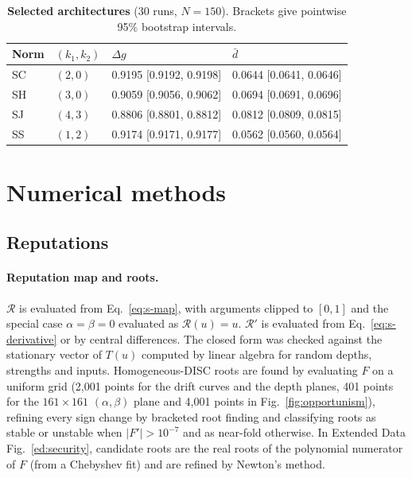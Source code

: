 \documentclass[10pt]{wlscirep}
\newcommand{\Rmap}{\mathscr{R}}            %
\theoremstyle{plain}
\theoremstyle{remark}
\begin{document}
\begin{table}[!htbp]
\centering
\caption{\textbf{Selected architectures} (30 runs, $N=150$). Brackets give pointwise 95\% bootstrap intervals.}
\label{tab:si-selected}
\small
\begin{tabular}{@{}llll@{}}
\toprule
Norm & $(k_1,k_2)$ & $\Delta g$ & $\bar d$\\
\midrule
SC & $(2,0)$ & 0.9195 [0.9192, 0.9198] & 0.0644 [0.0641, 0.0646]\\
SH & $(3,0)$ & 0.9059 [0.9056, 0.9062] & 0.0694 [0.0691, 0.0696]\\
SJ & $(4,3)$ & 0.8806 [0.8801, 0.8812] & 0.0812 [0.0809, 0.0815]\\
SS & $(1,2)$ & 0.9174 [0.9171, 0.9177] & 0.0562 [0.0560, 0.0564]\\
\bottomrule
\end{tabular}
\end{table}

\FloatBarrier
\section{Numerical methods}
\label{si:numerics}

\subsection{Reputations}

\paragraph{Reputation map and roots.} $\Rmap$ is evaluated from Eq.~\eqref{eq:s-map}, with arguments clipped to $[0,1]$ and the special case $\alpha=\beta=0$ evaluated as $\Rmap(u)=u$. $\Rmap'$ is evaluated from Eq.~\eqref{eq:s-derivative} or by central differences. The closed form was checked against the stationary vector of $T(u)$ computed by linear algebra for random depths, strengths and inputs. Homogeneous-DISC roots are found by evaluating $F$ on a uniform grid (2,001 points for the drift curves and the depth planes, 401 points for the $161\times161$ $(\alpha,\beta)$ plane and 4,001 points in Fig.~\ref{fig:opportunism}), refining every sign change by bracketed root finding and classifying roots as stable or unstable when $|F'|>10^{-7}$ and as near-fold otherwise. In Extended Data Fig.~\ref{ed:security}, candidate roots are the real roots of the polynomial numerator of $F$ (from a Chebyshev fit) and are refined by Newton's method.
\end{document}
